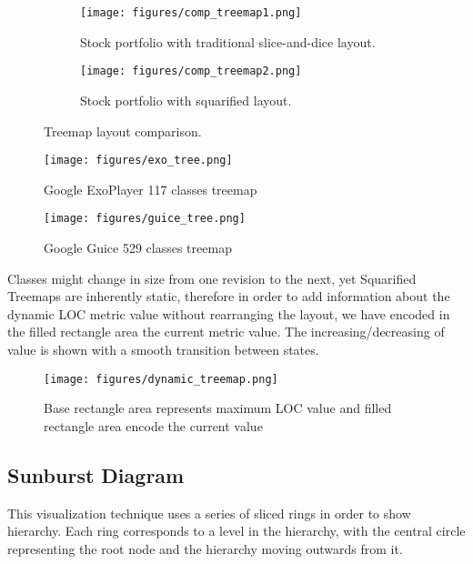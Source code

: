 \begin{figure}[!tbp]
  \begin{subfigure}[b]{0.4\textwidth}
    \texttt{[image: figures/comp\_treemap1.png]}
    \caption{Stock portfolio with traditional slice-and-dice layout.}
    \label{fig:comp_treemap1}
  \end{subfigure}
  \hfill
  \begin{subfigure}[b]{0.4\textwidth}
    \texttt{[image: figures/comp\_treemap2.png]}
    \caption{Stock portfolio with squarified layout.}
    \label{fig:comp_treemap2}
  \end{subfigure}
  \caption{Treemap layout comparison.}
\end{figure}

\begin{figure}[H]
  \centering
  \texttt{[image: figures/exo\_tree.png]}
  \caption{Google ExoPlayer 117 classes treemap}
  \label{fig:exo_tree}
\end{figure}

\begin{figure}[H]
  \centering
  \texttt{[image: figures/guice\_tree.png]}
  \caption{Google Guice 529 classes treemap}
  \label{fig:guice_tree}
\end{figure}

Classes might change in size from one revision to the next, yet Squarified Treemaps are inherently static, therefore in order to add information about the dynamic LOC metric value without rearranging the layout, we have encoded in the filled rectangle area the current metric value. The increasing/decreasing of value is shown with a smooth transition between states.

\begin{figure}[H]
  \centering
  \texttt{[image: figures/dynamic\_treemap.png]}
  \caption{Base rectangle area represents maximum LOC value and filled rectangle area encode the current value}
  \label{fig:dynamic_treemap}
\end{figure}

\subsection{Sunburst Diagram}
This visualization technique uses a series of sliced rings in order to show hierarchy. Each ring corresponds to a level in the hierarchy, with the central circle representing the root node and the hierarchy moving outwards from it.

